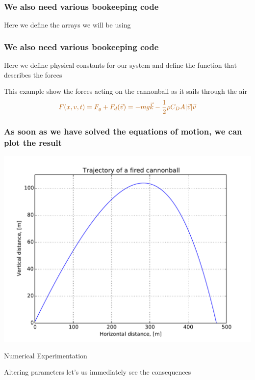 \documentclass[english, 12pt]{beamer}
\newcommand{\alrt}{\color{AlertColor}}
\begin{document}
\begin{frame}[fragile]
\frametitle{We also need various bookeeping code}

Here we define the arrays we will be using

\end{frame}

\begin{frame}[fragile]
\frametitle{We also need various bookeeping code}

Here we define physical constants for our system and define the function that describes the forces


This example show the forces acting on the cannonball as it sails through the air
$$\alrt F(x,v,t) = F_g + F_d(\vec{v}) = -mg\vec{k} - \frac{1}{2}\rho C_D A |\vec{v}|\vec{v}$$
\end{frame}

\begin{frame}[fragile]
\frametitle{As soon as we have solved the equations of motion, we can plot the result}


\end{frame}

\begin{frame}[fragile]
\begin{center}
	\includegraphics[width=\textwidth]{plot_cannonball1}
\end{center}
\end{frame}

\begin{frame}
\begin{center}
{\Huge \color{DarkFern} Numerical Experimentation}

Altering parameters let's us immediately see the consequences
\end{center}
\end{frame}
\end{document}
